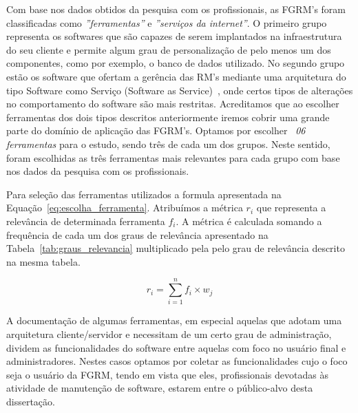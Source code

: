 Com base nos dados obtidos da pesquisa com os profissionais, as FGRM's foram
classificadas como \textit{''ferramentas''} e \textit{''serviços da internet''}.
O primeiro grupo representa os softwares que são capazes de serem implantados na
infraestrutura do seu cliente e permite algum grau de personalização de pelo
menos um dos componentes, como por exemplo, o banco de dados utilizado. No
segundo grupo estão os software que ofertam a gerência das RM's mediante uma
arquitetura do tipo Software como Serviço (Software as
Service)~\cite{fox2013engineering}, onde certos tipos de alterações no
comportamento do software são mais restritas. Acreditamos que ao escolher
ferramentas dos dois tipos descritos anteriormente iremos cobrir uma grande
parte do domínio de aplicação das FGRM's. Optamos por escolher ~\textit{06
	ferramentas} para o estudo, sendo três de cada um dos grupos. Neste sentido,
foram escolhidas as três ferramentas mais relevantes para cada grupo com base
nos dados da pesquisa com os profissionais.

Para seleção das ferramentas utilizados a formula apresentada na
Equação~\ref{eq:escolha_ferramenta}.  Atribuímos a métrica $r_i$ que representa
a relevância de determinada ferramenta $f_i$. A métrica é calculada somando a
frequência de cada um dos graus de relevância apresentado na
Tabela~\ref{tab:graus_relevancia} multiplicado pela pelo grau de relevância
descrito na mesma tabela.

\begin{equation}
\label{eq:escolha_ferramenta}
r_i = \sum_{i=1}^{n} f_i \times w_j
\end{equation}

A documentação de algumas ferramentas, em especial aquelas que adotam uma
arquitetura cliente/servidor e necessitam de um certo grau de administração,
dividem as funcionalidades do software entre aquelas com foco no usuário final e
administradores. Nestes casos optamos por coletar as funcionalidades cujo o foco
seja o usuário da FGRM, tendo em vista que eles, profissionais devotadas às
atividade de manutenção de software, estarem entre o público-alvo desta
dissertação.

\begin{table}[htb]
\centering
\caption{Graus de Relevância}
\label{tab:graus_relevancia}
\end{table}


